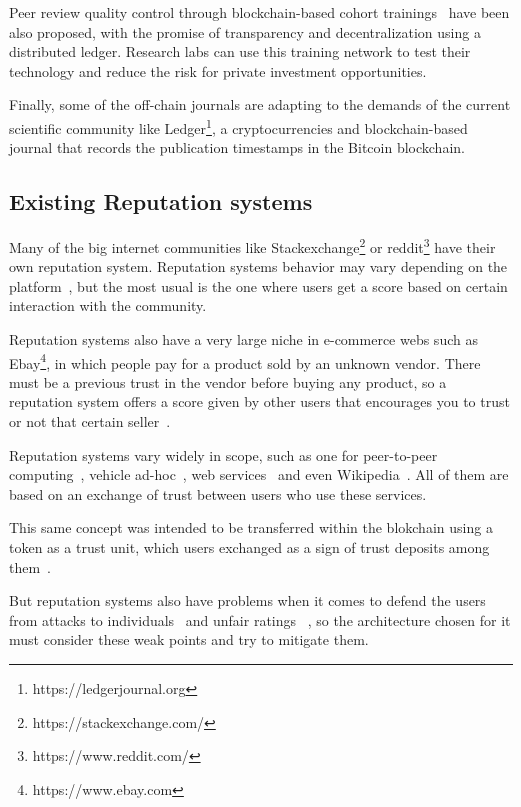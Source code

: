 Peer review quality control through blockchain-based cohort
trainings~\cite{dhillon2016bench} have been also proposed, with the promise of
transparency and decentralization using a distributed ledger. Research labs can
use this training network to test their technology and reduce the risk for
private investment opportunities.

Finally, some of the off-chain journals are adapting to the demands of the
current scientific community like Ledger\footnote{https://ledgerjournal.org}, a
cryptocurrencies and blockchain-based journal that records the publication
timestamps in the Bitcoin blockchain.

\subsection{Existing Reputation systems}
\label{soa:rs}
Many of the big internet communities like
Stackexchange\footnote{https://stackexchange.com/} or
reddit\footnote{https://www.reddit.com/} have their own reputation system.
Reputation systems behavior may vary depending on the
platform~\cite{josang2002beta}, but the most usual is the one where users get a
score based on certain interaction with the community.

Reputation systems also have a very large niche in e-commerce webs such as
Ebay\footnote{https://www.ebay.com}, in which people pay for a product sold by
an unknown vendor. There must be a previous trust in the vendor before buying
any product, so a reputation system offers a score given by other users that
encourages you to trust or not that certain seller~\cite{resnick2002trust}.

Reputation systems vary widely in scope, such as one for peer-to-peer
computing~\cite{zhou2007powertrust}, vehicle ad-hoc~\cite{dotzer2005vars}, web
services~\cite{moore2008reputation} and even Wikipedia~\cite{adler2007content}.
All of them are based on an exchange of trust between users who use these
services.

This same concept was intended to be transferred within the blokchain using a
token as a trust unit, which users exchanged as a sign of trust deposits among
them~\cite{sharples2016blockchain}.

But reputation systems also have problems when it comes to defend the users from
attacks to individuals~\cite{hoffman2009survey} and unfair ratings
~\cite{whitby2004filtering}, so the architecture chosen for it must consider
these weak points and try to mitigate them.

